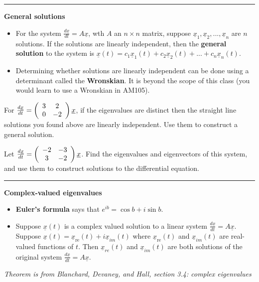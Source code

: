 \documentclass[12pt,letterpaper,noanswers]{exam}
\begin{document}
\vspace{0.2cm}
\hrule
\vspace{0.2cm}

\noindent\textbf{General solutions}
\begin{tcolorbox}
\begin{itemize}
    \item 
For the system $\frac{d\underline{x}}{dt} = A\underline{x}$, wth $A$ an $n\times n$ matrix, suppose $\underline{x}_1, \underline{x}_2,...,\underline{x}_n$ are $n$ solutions.  If the solutions are linearly independent, then the \textbf{general solution} to the system is $\underline{x}(t) = c_1\underline{x}_1(t) + c_2 \underline{x}_2(t) + ... + c_n\underline{x}_n(t)$.
\item Determining whether solutions are linearly independent can be done using a determinant called the \textbf{Wronskian}.  It is beyond the scope of this class (you would learn to use a Wronskian in AM105).
\end{itemize}
\end{tcolorbox}

For $\frac{d\underline{x}}{dt} = \left(\begin{array}{c c}3 & 2 \\ 0 & -2\end{array}\right)\underline{x}$, if the eigenvalues are distinct then the straight line solutions you found above are linearly independent.  Use them to construct a general solution.
\vspace{1.5in}

Let $\frac{d\underline{x}}{dt} = \left(\begin{array}{c c}-2 & -3 \\ 3 & -2\end{array}\right)\underline{x}$.  Find the eigenvalues and eigenvectors of this system, and use them to construct solutions to the differential equation.
\vspace{2in}


\vspace{0.2cm}
\hrule
\vspace{0.2cm}
\noindent\textbf{Complex-valued eigenvalues}
\begin{tcolorbox}
\begin{itemize}
    \item \textbf{Euler's formula} says that $e^{ib} = \cos b + i\sin b$.
    \item Suppose $\underline{x}(t)$ is a complex valued solution to a linear system $\frac{d\underline{x}}{dt}= A\underline{x}$.  Suppose $\underline{x}(t) = \underline{x}_{\text{re}}(t) + i\underline{x}_{im}(t)$ where $\underline{x}_{\text{re}}(t)$ and $\underline{x}_{im}(t)$ are real-valued functions of $t$.  Then $\underline{x}_{re}(t)$ and $\underline{x}_{im}(t)$ are both solutions of the original system $\frac{d\underline{x}}{dt}= A\underline{x}$.
\end{itemize}
\emph{Theorem is from Blanchard, Devaney, and Hall, section 3.4: complex eigenvalues}

\end{tcolorbox}
\end{document}
